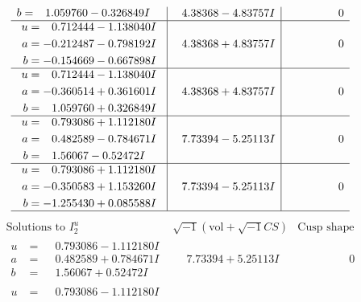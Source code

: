 \documentclass[1p]{elsarticle_modified}
\theoremstyle{definition}
\newcommand{\I}{\sqrt{-1}}
\begin{document}
$$\begin{array}{c|c|c}
\begin{aligned}
b &= \phantom{-}1.059760 - 0.326849 I\end{aligned}
 & \phantom{-}4.38368 - 4.83757 I & \phantom{-0.000000 } 0 \\ \hline\begin{aligned}
u &= \phantom{-}0.712444 - 1.138040 I \\
a &= -0.212487 - 0.798192 I \\
b &= -0.154669 - 0.667898 I\end{aligned}
 & \phantom{-}4.38368 + 4.83757 I & \phantom{-0.000000 } 0 \\ \hline\begin{aligned}
u &= \phantom{-}0.712444 - 1.138040 I \\
a &= -0.360514 + 0.361601 I \\
b &= \phantom{-}1.059760 + 0.326849 I\end{aligned}
 & \phantom{-}4.38368 + 4.83757 I & \phantom{-0.000000 } 0 \\ \hline\begin{aligned}
u &= \phantom{-}0.793086 + 1.112180 I \\
a &= \phantom{-}0.482589 - 0.784671 I \\
b &= \phantom{-}1.56067 - 0.52472 I\end{aligned}
 & \phantom{-}7.73394 - 5.25113 I & \phantom{-0.000000 } 0 \\ \hline\begin{aligned}
u &= \phantom{-}0.793086 + 1.112180 I \\
a &= -0.350583 + 1.153260 I \\
b &= -1.255430 + 0.085588 I\end{aligned}
 & \phantom{-}7.73394 - 5.25113 I & \phantom{-0.000000 } 0\\
 \hline 
 \end{array}$$\newpage$$\begin{array}{c|c|c}  
\text{Solutions to }I^u_{2}& \I (\text{vol} + \sqrt{-1}CS) & \text{Cusp shape}\\
 \hline 
\begin{aligned}
u &= \phantom{-}0.793086 - 1.112180 I \\
a &= \phantom{-}0.482589 + 0.784671 I \\
b &= \phantom{-}1.56067 + 0.52472 I\end{aligned}
 & \phantom{-}7.73394 + 5.25113 I & \phantom{-0.000000 } 0 \\ \hline\begin{aligned}
u &= \phantom{-}0.793086 - 1.112180 I \\

\end{aligned}
\end{array}$$
\end{document}
